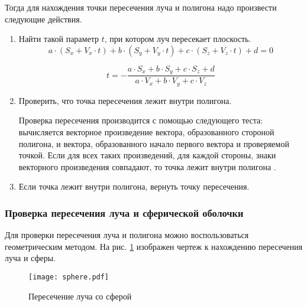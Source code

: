 Тогда для нахождения точки пересечения луча и полигона надо произвести следующие действия.

\begin{enumerate}
	\item Найти такой параметр $t$, при котором луч пересекает плоскость.
	\begin{equation}
		a \cdot (S_x + V_x \cdot t) + b \cdot (S_y + V_y \cdot t) + c \cdot (S_z + V_z \cdot t) + d = 0
	\end{equation}
	
	\begin{equation}
		t = - \frac{a \cdot S_x + b \cdot S_y + c \cdot S_z + d}{a \cdot V_x + b \cdot V_y + c \cdot V_z}
	\end{equation}
	
	\item Проверить, что точка пересечения лежит внутри полигона. 
	
	Проверка пересечения производится с помощью следующего теста: вычисляется векторное произведение вектора, образованного стороной полигона, и вектора, образованного начало первого вектора и проверяемой точкой. Если для всех таких произведений, для каждой стороны, знаки векторного произведения совпадают, то точка лежит внутри полигона \cite{bib:13}.
	
	\item Если точка лежит внутри полигона, вернуть точку пересечения.
\end{enumerate}

\subsubsection{Проверка пересечения луча и сферической оболочки}

Для проверки пересечения луча и полигона можно воспользоваться геометрическим методом. На рис. \ref{img:sphere} изображен чертеж к нахождению пересечения луча и сферы.

\noindent
\begin{figure}[h!]
	\centering
    \texttt{[image: sphere.pdf]}
    \caption{Пересечение луча со сферой}
    \label{img:sphere}
\end{figure}

